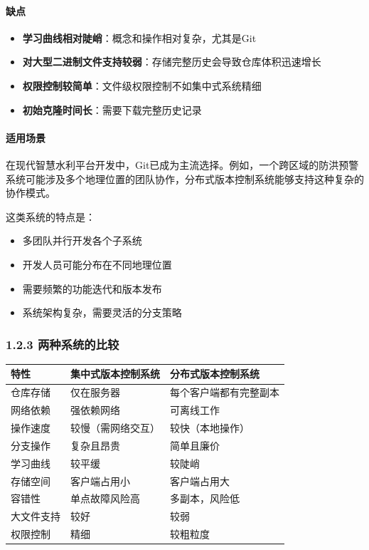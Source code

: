 \paragraph{缺点}\label{ux7f3aux70b9-1}

\begin{itemize}
\tightlist
\item
  \textbf{学习曲线相对陡峭}：概念和操作相对复杂，尤其是Git
\item
  \textbf{对大型二进制文件支持较弱}：存储完整历史会导致仓库体积迅速增长
\item
  \textbf{权限控制较简单}：文件级权限控制不如集中式系统精细
\item
  \textbf{初始克隆时间长}：需要下载完整历史记录
\end{itemize}

\paragraph{适用场景}\label{ux9002ux7528ux573aux666f-1}

在现代智慧水利平台开发中，Git已成为主流选择。例如，一个跨区域的防洪预警系统可能涉及多个地理位置的团队协作，分布式版本控制系统能够支持这种复杂的协作模式。

这类系统的特点是：

\begin{itemize}
\tightlist
\item
  多团队并行开发各个子系统
\item
  开发人员可能分布在不同地理位置
\item
  需要频繁的功能迭代和版本发布
\item
  系统架构复杂，需要灵活的分支策略
\end{itemize}

\subsubsection{1.2.3
两种系统的比较}\label{ux4e24ux79cdux7cfbux7edfux7684ux6bd4ux8f83}

\begin{longtable}[]{@{}lll@{}}
\toprule\noalign{}
特性 & 集中式版本控制系统 & 分布式版本控制系统 \\
\midrule\noalign{}
\endhead
\bottomrule\noalign{}
\endlastfoot
仓库存储 & 仅在服务器 & 每个客户端都有完整副本 \\
网络依赖 & 强依赖网络 & 可离线工作 \\
操作速度 & 较慢（需网络交互） & 较快（本地操作） \\
分支操作 & 复杂且昂贵 & 简单且廉价 \\
学习曲线 & 较平缓 & 较陡峭 \\
存储空间 & 客户端占用小 & 客户端占用大 \\
容错性 & 单点故障风险高 & 多副本，风险低 \\
大文件支持 & 较好 & 较弱 \\
权限控制 & 精细 & 较粗粒度 \\
\end{longtable}

